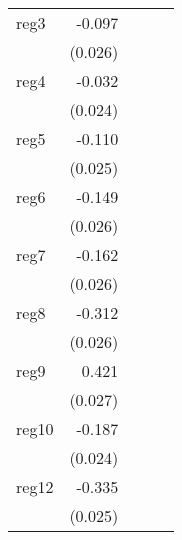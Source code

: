 {\begin{longtable}{l*{4}{D{.}{.}{-1}}}
\addlinespace
reg3        &      -0.097\sym{***}&                     &                     &                     \\
            &     (0.026)         &                     &                     &                     \\
\addlinespace
reg4        &      -0.032         &                     &                     &                     \\
            &     (0.024)         &                     &                     &                     \\
\addlinespace
reg5        &      -0.110\sym{***}&                     &                     &                     \\
            &     (0.025)         &                     &                     &                     \\
\addlinespace
reg6        &      -0.149\sym{***}&                     &                     &                     \\
            &     (0.026)         &                     &                     &                     \\
\addlinespace
reg7        &      -0.162\sym{***}&                     &                     &                     \\
            &     (0.026)         &                     &                     &                     \\
\addlinespace
reg8        &      -0.312\sym{***}&                     &                     &                     \\
            &     (0.026)         &                     &                     &                     \\
\addlinespace
reg9        &       0.421\sym{***}&                     &                     &                     \\
            &     (0.027)         &                     &                     &                     \\
\addlinespace
reg10       &      -0.187\sym{***}&                     &                     &                     \\
            &     (0.024)         &                     &                     &                     \\
\addlinespace
reg12       &      -0.335\sym{***}&                     &                     &                     \\
            &     (0.025)         &                     &                     &                     \\

\end{longtable}}
